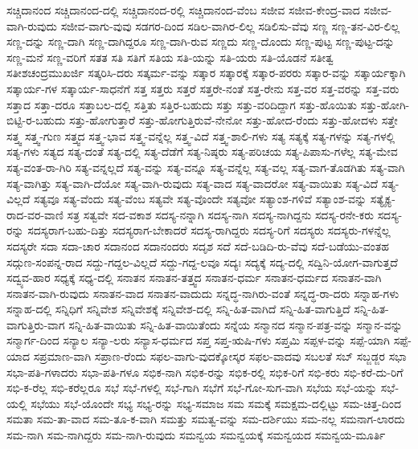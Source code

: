 {ಸಚ್ಚಿದಾನಂದ
ಸಚ್ಚಿದಾನಂದ-ದಲ್ಲಿ
ಸಚ್ಚಿದಾನಂದ-ರಲ್ಲಿ
ಸಚ್ಚಿದಾನಂದ-ವೆಂಬ
ಸಜೀವ
ಸಜೀವ-ಕೇಂದ್ರ-ವಾದ
ಸಜೀವ-ವಾಗಿ-ರುವುದು
ಸಜೀವ-ವಾಗು-ವುವು
ಸಡಗರ-ದಿಂದ
ಸಡಿಲ-ವಾಗಿರ-ಲಿಲ್ಲ
ಸಡಿಲಿಸು-ವೆವು
ಸಣ್ಣ
ಸಣ್ಣ-ತನ-ವಿರ-ಲಿಲ್ಲ
ಸಣ್ಣ-ದನ್ನು
ಸಣ್ಣ-ದಾಗಿ
ಸಣ್ಣ-ದಾಗಿದ್ದರೂ
ಸಣ್ಣ-ದಾಗಿ-ರುವ
ಸಣ್ಣದು
ಸಣ್ಣ-ದೊಂದು
ಸಣ್ಣ-ಪುಟ್ಟ
ಸಣ್ಣ-ಪುಟ್ಟ-ದನ್ನು
ಸಣ್ಣ-ಮನೆ
ಸಣ್ಣ-ವರಿಗೆ
ಸತತ
ಸತಿ
ಸತಿಗೆ
ಸತಿಯ
ಸತಿ-ಯನ್ನು
ಸತಿ-ಯರು
ಸತಿ-ಯೊಡನೆ
ಸತೀತ್ವ
ಸತೀಶಚಂದ್ರಮುಖರ್ಜಿ
ಸತ್ಕರಿಸಿ-ದರು
ಸತ್ಕರ್ಮ-ವನ್ನು
ಸತ್ಕಾರ
ಸತ್ಕಾರಕ್ಕೆ
ಸತ್ಕಾರ-ಪರರು
ಸತ್ಕಾರ-ವನ್ನು
ಸತ್ಕಾರ್ಯಕ್ಕಾಗಿ
ಸತ್ಕಾರ್ಯ-ಗಳ
ಸತ್ಕಾರ್ಯ-ಸಾಧನೆಗೆ
ಸತ್ತ
ಸತ್ತರು
ಸತ್ತರೆ
ಸತ್ತರೇ-ನಂತೆ
ಸತ್ತ-ರೇನು
ಸತ್ತ-ವರ
ಸತ್ತ-ವರನ್ನು
ಸತ್ತ-ವರು
ಸತ್ತಾದ
ಸತ್ತಾ-ದರೂ
ಸತ್ತಾಬಲ-ದಲ್ಲಿ
ಸತ್ತಿತು
ಸತ್ತಿರ-ಬಹುದು
ಸತ್ತು
ಸತ್ತು-ವರಿದಿದ್ದಾಗ
ಸತ್ತು-ಹೊಯಿತು
ಸತ್ತು-ಹೋಗಿ-ಬಿಟ್ಟಿ-ರ-ಬಹುದು
ಸತ್ತು-ಹೋಗುತ್ತಾರೆ
ಸತ್ತು-ಹೋಗುತ್ತಿರುವೆ-ನೇನೋ
ಸತ್ತು-ಹೋದ-ರೆಂದು
ಸತ್ತು-ಹೋದಳು
ಸತ್ತೇ
ಸತ್ತ್ವ
ಸತ್ತ್ವ-ಗುಣ
ಸತ್ತ್ವದ
ಸತ್ತ್ವ-ಭಾವ
ಸತ್ತ್ವ-ವನ್ನೆಲ್ಲ
ಸತ್ತ್ವ-ವಿದೆ
ಸತ್ತ್ವ-ಶಾಲಿ-ಗಳು
ಸತ್ಯ
ಸತ್ಯಕ್ಕೆ
ಸತ್ಯ-ಗಳನ್ನು
ಸತ್ಯ-ಗಳಲ್ಲಿ
ಸತ್ಯ-ಗಳು
ಸತ್ಯದ
ಸತ್ಯ-ದಂತೆ
ಸತ್ಯ-ದಲ್ಲಿ
ಸತ್ಯ-ದೆಡೆಗೆ
ಸತ್ಯ-ನಿಷ್ಠರು
ಸತ್ಯ-ಪರಿಚಯ
ಸತ್ಯ-ಪಿಪಾಸು-ಗಳೆಲ್ಲ
ಸತ್ಯ-ಮೇವ
ಸತ್ಯ-ವಂತ-ರಾ-ಗಿರಿ
ಸತ್ಯ-ವನ್ನಲ್ಲದೆ
ಸತ್ಯ-ವನ್ನು
ಸತ್ಯ-ವನ್ನೂ
ಸತ್ಯ-ವನ್ನೆಲ್ಲ
ಸತ್ಯ-ವಲ್ಲ
ಸತ್ಯ-ವಾಗ-ತೊಡಗಿತು
ಸತ್ಯ-ವಾಗಿ
ಸತ್ಯ-ವಾಗಿತ್ತು
ಸತ್ಯ-ವಾಗಿ-ದೆಯೋ
ಸತ್ಯ-ವಾಗಿ-ರುವುದು
ಸತ್ಯ-ವಾದ
ಸತ್ಯ-ವಾದರೋ
ಸತ್ಯ-ವಾಯಿತು
ಸತ್ಯ-ವಿದೆ
ಸತ್ಯ-ವಿಲ್ಲದೆ
ಸತ್ಯವೂ
ಸತ್ಯ-ವೆಂದು
ಸತ್ಯ-ವೆಂಬ
ಸತ್ಯವೇ
ಸತ್ಯ-ವೊಂದೇ
ಸತ್ಯವೋ
ಸತ್ಯಾಂಶ-ಗಳಿವೆ
ಸತ್ಯಾಂಶ-ವನ್ನು
ಸತ್ಯೈಕ್ಯ-ರಾದ-ವರ-ವಾಣಿ
ಸತ್ರ
ಸತ್ವವೇ
ಸದ-ವಕಾಶ
ಸದಸ್ಯ-ನನ್ನಾಗಿ
ಸದಸ್ಯ-ನಾಗಿ
ಸದಸ್ಯ-ನಾಗಿದ್ದನು
ಸದಸ್ಯ-ರನೇ-ಕರು
ಸದಸ್ಯ-ರನ್ನು
ಸದಸ್ಯರಾಗ-ಬಹು-ದಿತ್ತು
ಸದಸ್ಯರಾಗ-ಬೇಕಾದರೆ
ಸದಸ್ಯ-ರಾಗಿದ್ದರು
ಸದಸ್ಯ-ರಿಗೆ
ಸದಸ್ಯರು
ಸದಸ್ಯರು-ಗಳನ್ನೆಲ್ಲ
ಸದಸ್ಯರೇ
ಸದಾ
ಸದಾ-ಚಾರ
ಸದಾನಂದ
ಸದಾನಂದರು
ಸದೃಶ
ಸದೆ
ಸದೆ-ಬಡಿದಿ-ರು-ವೆವು
ಸದೆ-ಬಡೆಯು-ವಂತಹ
ಸದ್ಗುಣ-ಸಂಪನ್ನ-ರಾದ
ಸದ್ದು-ಗದ್ದಲ-ವಿಲ್ಲದೆ
ಸದ್ದು-ಗದ್ದ-ಲವೂ
ಸದ್ಯಃ
ಸದ್ಯಕ್ಕೆ
ಸದ್ಯ-ದಲ್ಲಿ
ಸದ್ವಿನಿ-ಯೋಗ-ವಾಗುತ್ತದೆ
ಸದ್ವ್ಯವ-ಹಾರ
ಸಧ್ಯಕ್ಕೆ
ಸಧ್ಯ-ದಲ್ಲಿ
ಸನಾತನ
ಸನಾತನ-ತತ್ತ್ವದ
ಸನಾತನ-ಧರ್ಮ
ಸನಾತನ-ಧರ್ಮದ
ಸನಾತನ-ವಾಗಿ
ಸನಾತನ-ವಾಗಿ-ರುವುದು
ಸನಾತನ-ವಾದ
ಸನಾತನ-ವಾದುದು
ಸನ್ನದ್ಧ-ನಾಗಿರು-ವಂತೆ
ಸನ್ನದ್ಧ-ರಾ-ದರು
ಸನ್ನಾಹ-ಗಳು
ಸನ್ನಾಹ-ದಲ್ಲಿ
ಸನ್ನಿಧಿಗೆ
ಸನ್ನಿವೇಶ
ಸನ್ನಿವೇಶಕ್ಕೆ
ಸನ್ನಿವೇಶ-ದಲ್ಲಿ
ಸನ್ನಿ-ಹಿತ-ವಾಗಿದೆ
ಸನ್ನಿ-ಹಿತ-ವಾಗುತ್ತಿದೆ
ಸನ್ನಿ-ಹಿತ-ವಾಗುತ್ತಿರು-ವಾಗ
ಸನ್ನಿ-ಹಿತ-ವಾಯಿತು
ಸನ್ನಿ-ಹಿತ-ವಾಯಿತೆಂದು
ಸನ್ನೆಯ
ಸನ್ಮಾನದ
ಸನ್ಮಾನ-ಪತ್ರ-ವನ್ನು
ಸನ್ಮಾನ-ವನ್ನು
ಸನ್ಮಾರ್ಗ-ದಿಂದ
ಸನ್ಯಾಲ
ಸನ್ಯಾ-ಲರು
ಸನ್ಯಾಸ-ಧರ್ಮದ
ಸಪ್ತ
ಸಪ್ತ-ಋಷಿ-ಗಳು
ಸಪ್ತಮಿ
ಸಪ್ಪಳ-ವನ್ನು
ಸಪ್ಪೆ-ಯಾಗಿ
ಸಪ್ಪೆ-ಯಾದ
ಸಪ್ರಮಾಣ-ವಾಗಿ
ಸಪ್ರಾಣ-ರೆಂದು
ಸಫಲ-ವಾಗು-ವುದಕ್ಕೋಸ್ಕರ
ಸಫಲ-ವಾದವು
ಸಬಲತೆ
ಸಬ್
ಸಬ್ಜಡ್ಜರ
ಸಭಾ
ಸಭಾ-ಪತಿ-ಗಳಾದರು
ಸಭಾ-ಪತಿ-ಗಳೂ
ಸಭಿಕ-ನಾಗಿ
ಸಭಿಕ-ರನ್ನು
ಸಭಿಕ-ರಲ್ಲಿ
ಸಭಿಕ-ರಿಗೆ
ಸಭಿ-ಕರು
ಸಭಿ-ಕರೆ-ದು-ರಿಗೆ
ಸಭಿ-ಕ-ರೆಲ್ಲ
ಸಭಿ-ಕರೆಲ್ಲರೂ
ಸಭೆ
ಸಭೆ-ಗಳಲ್ಲಿ
ಸಭೆ-ಗಾಗಿ
ಸಭೆಗೆ
ಸಭೆ-ಗೋ-ಸುಗ-ವಾಗಿ
ಸಭೆಯ
ಸಭೆ-ಯನ್ನು
ಸಭೆ-ಯಲ್ಲಿ
ಸಭೆಯು
ಸಭೆ-ಯೊಂದೇ
ಸಭ್ಯ
ಸಭ್ಯ-ರನ್ನು
ಸಭ್ಯ-ಸಮಾಜ
ಸಮ
ಸಮಕ್ಕೆ
ಸಮಕ್ಷಮ-ದಲ್ಲಿಟ್ಟು
ಸಮ-ಚಿತ್ತ-ದಿಂದ
ಸಮತಾ
ಸಮ-ತಾ-ವಾದ
ಸಮ-ತೂ-ಕ-ವಾಗಿ
ಸಮತ್ತು
ಸಮತ್ವ-ವನ್ನು
ಸಮ-ದರ್ಶಿಯು
ಸಮ-ನಲ್ಲ
ಸಮನಾಗ-ಲಾರದು
ಸಮ-ನಾಗಿ
ಸಮ-ನಾಗಿದ್ದರು
ಸಮ-ನಾಗಿ-ರುವುದು
ಸಮನ್ವಯ
ಸಮನ್ವಯಕ್ಕೆ
ಸಮನ್ವಯದ
ಸಮನ್ವಯ-ಮೂರ್ತಿ
}
